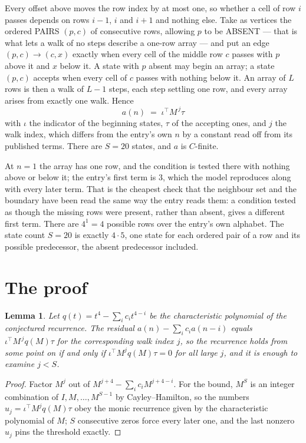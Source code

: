 \documentclass[11pt,a4paper]{article}
\theoremstyle{plain}
\newtheorem{lemma}[theorem]{Lemma}
\theoremstyle{definition}
\begin{document}
Every offset above moves the row index by at most one, so whether a cell of row $i$ passes
depends on rows $i-1$, $i$ and $i+1$ and nothing else. Take as vertices the ordered PAIRS
$(p,c)$ of consecutive rows, allowing $p$ to be ABSENT --- that is what lets a walk of no steps
describe a one-row array --- and put an edge $(p,c)\to(c,x)$ exactly when every cell of the
middle row $c$ passes with $p$ above it and $x$ below it. A state with $p$ absent may begin an
array; a state $(p,c)$ accepts when every cell of $c$ passes with nothing below it. An array of
$L$ rows is then a walk of $L-1$ steps, each step settling one row, and every array arises from
exactly one walk. Hence
\[
a(n)\;=\;\iota^{\!\top}M^{\,j}\tau
\]
with $\iota$ the indicator of the beginning states, $\tau$ of the accepting ones, and $j$ the
walk index, which differs from the entry's own $n$ by a constant read off from its published
terms. There are $S=20$ states, and $a$ is $C$-finite.

At $n=1$ the array has one row, and
the condition is tested there with nothing above or below it; the entry's first term is
$3$, which the model reproduces along with every later term. That is the cheapest check
that the neighbour set and the boundary have been read the same way the entry reads them: a
condition tested as though the missing rows were present, rather than absent, gives a different
first term. There are $4^{1}=4$ possible rows over the entry's own alphabet. The state count $S=20$ is exactly $4\cdot5$,
one state for each ordered pair of a row and its possible predecessor, the absent predecessor
included.

\section{The proof}

\begin{lemma}\label{lem:crit}
Let $q(t)=t^{4}-\sum_i c_it^{4-i}$ be the characteristic polynomial of the
conjectured recurrence. The residual $a(n)-\sum_ic_ia(n-i)$ equals
$\iota^{\!\top}M^{\,j}q(M)\tau$ for the corresponding walk index $j$, so the recurrence
holds from some point on if and only if $\iota^{\!\top}M^{j}q(M)\tau=0$ for all large $j$,
and it is enough to examine $j<S$.
\end{lemma}

\begin{proof}
Factor $M^{j}$ out of $M^{j+4}-\sum_ic_iM^{j+4-i}$. For the bound, $M^{S}$
is an integer combination of $I,M,\dots,M^{S-1}$ by Cayley--Hamilton, so the numbers
$u_j=\iota^{\!\top}M^{j}q(M)\tau$ obey the monic recurrence given by the characteristic
polynomial of $M$; $S$ consecutive zeros force every later one, and the last nonzero $u_j$
pins the threshold exactly.
\end{proof}
\end{document}
